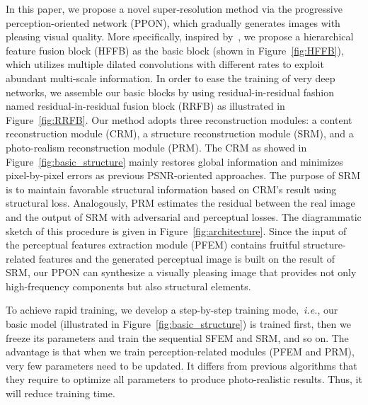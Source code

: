 \documentclass[preprint]{elsarticle}
\newcommand{\ie}{\textit{i.e.}}
\begin{document}
In this paper, we propose a novel super-resolution method via the progressive perception-oriented network (PPON), which gradually generates images with pleasing visual quality. More specifically, inspired by~\cite{ESPNet}, we propose a hierarchical feature fusion block (HFFB) as the basic block (shown in Figure~\ref{fig:HFFB}), which utilizes multiple dilated convolutions with different rates to exploit abundant multi-scale information. In order to ease the training of very deep networks, we assemble our basic blocks by using residual-in-residual fashion~\cite{RCAN,ESRGAN} named residual-in-residual fusion block (RRFB) as illustrated in Figure~\ref{fig:RRFB}. Our method adopts three reconstruction modules: a content reconstruction module (CRM), a structure reconstruction module (SRM), and a photo-realism reconstruction module (PRM). The CRM as showed in Figure~\ref{fig:basic_structure} mainly restores global information and minimizes pixel-by-pixel errors as previous PSNR-oriented approaches. The purpose of SRM is to maintain favorable structural information based on CRM's result using structural loss. Analogously, PRM estimates the residual between the real image and the output of SRM with adversarial and perceptual losses. The diagrammatic sketch of this procedure is given in Figure~\ref{fig:architecture}. Since the input of the perceptual features extraction module (PFEM) contains fruitful structure-related features and the generated perceptual image is built on the result of SRM, our PPON can synthesize a visually pleasing image that provides not only high-frequency components but also structural elements.


To achieve rapid training, we develop a step-by-step training mode,~\ie, our basic model (illustrated in Figure~\ref{fig:basic_structure}) is trained first, then we freeze its parameters and train the sequential SFEM and SRM, and so on. The advantage is that when we train perception-related modules (PFEM and PRM), very few parameters need to be updated. It differs from previous algorithms that they require to optimize all parameters to produce photo-realistic results. Thus, it will reduce training time. 
\end{document}
